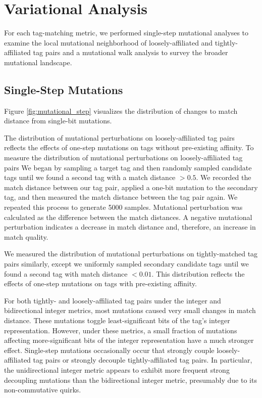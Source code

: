 \section{Variational Analysis} \label{sec:variational}

For each tag-matching metric, we performed single-step mutational analyses to examine the local mutational neighborhood of loosely-affiliated and tightly-affiliated tag pairs and a mutational walk analysis to survey the broader mutational landscape.

\subsection{Single-Step Mutations}



Figure \ref{fig:mutational_step} visualizes the distribution of changes to match distance from single-bit mutations.

The distribution of mutational perturbations on loosely-affiliated tag pairs reflects the effects of one-step mutations on tags without pre-existing affinity.
To measure the distribution of mutational perturbations on loosely-affiliated tag pairs We began by sampling a target tag and then randomly sampled candidate tags until we found a second tag with a match distance $> 0.5$.
We recorded the match distance between our tag pair, applied a one-bit mutation to the secondary tag, and then measured the match distance between the tag pair again.
We repeated this process to generate 5000 samples.
Mutational perturbation was calculated as the difference between the match distances.
A negative mutational perturbation indicates a decrease in match distance and, therefore, an increase in match quality.

We measured the distribution of mutational perturbations on tightly-matched tag pairs similarly, except we uniformly sampled secondary candidate tags until we found a second tag with match distance $< 0.01$.
This distribution reflects the effects of one-step mutations on tags with pre-existing affinity.

For both tightly- and loosely-affiliated tag pairs under the integer and bidirectional integer metrics, most mutations caused very small changes in match distance.
These mutations toggle least-significant bits of the tag's integer representation.
However, under these metrics, a small fraction of mutations affecting more-significant bits of the integer representation have a much stronger effect.
Single-step mutations occasionally occur that strongly couple loosely-affiliated tag pairs or strongly decouple tightly-affiliated tag pairs.
In particular, the unidirectional integer metric appears to exhibit more frequent strong decoupling mutations than the bidirectional integer metric, presumably due to its non-commutative quirks.

